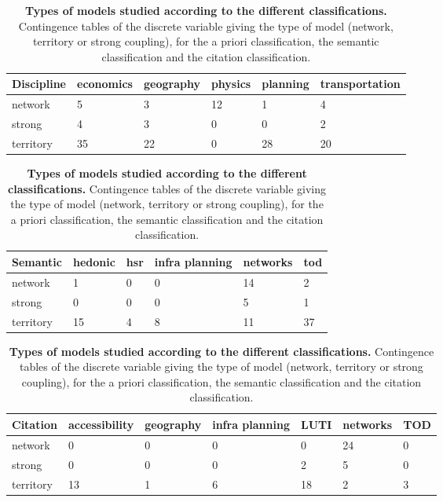 \documentclass[10pt]{article}
\begin{document}
\begin{table}
\caption{\textbf{Types of models studied according to the different classifications.} Contingence tables of the discrete variable giving the type of model (network, territory or strong coupling), for the a priori classification, the semantic classification and the citation classification.\label{tab:modelography:what}}\medskip
\begin{center}
\begin{tabular}{|p{2.4cm}|p{2.4cm}p{2.4cm}p{2.4cm}p{2.4cm}p{2.4cm}|}
\hline
Discipline  &  economics & geography & physics & planning & transportation\\\hline
network     &     5      &      3    &   12    &    1     &         4  \\
strong      &     4      &     3     &   0     &   0      &        2  \\
territory   &    35      &    22     &   0     &    28    &         20 \\\hline  
\end{tabular}

\medskip

\begin{tabular}{|p{2.4cm}|p{2.4cm}p{2.4cm}p{2.4cm}p{2.4cm}p{2.4cm}|}
\hline
Semantic  &  hedonic & hsr & infra planning & networks & tod\\\hline
network   &       1  & 0   &          0     &  14      & 2 \\
strong    &       0  &  0  &            0   &     5    & 1  \\
territory &      15  &  4  &            8   &    11    &  37 \\ \hline
\end{tabular}

\medskip

\begin{tabular}{|p{2cm}|p{2cm}p{2cm}p{2cm}p{2cm}p{2cm}p{2cm}|}
\hline
Citation  &  accessibility & geography & infra planning & LUTI & networks & TOD \\\hline
network   &            0   &     0     &         0      &   0  &     24   &  0 \\
strong    &            0   &      0    &          0     &   2  &      5   &  0 \\
territory &           13   &      1    &          6     &  18  &      2   &  3 \\\hline
\end{tabular}
\end{center}
\end{table}
\end{document}
